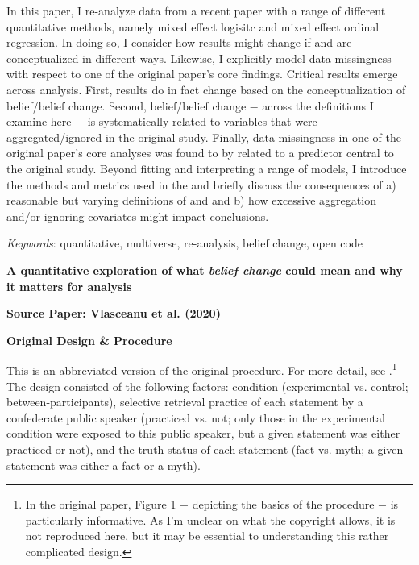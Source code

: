 \documentclass[12pt]{article}  %
\begin{document}
\noindent In this paper, I re-analyze data from a recent paper \parencite{vlasceanu_synchronization_2020} with a range of different quantitative methods, namely mixed effect logisitc and mixed effect ordinal regression. In doing so, I consider how results might change if  and  are conceptualized in different ways. Likewise, I explicitly model data missingness with respect to one of the original paper's core findings. Critical results emerge across analysis. First, results do in fact change based on the conceptualization of belief/belief change. Second, belief/belief change $-$ across the definitions I examine here $-$ is systematically related to variables that were aggregated/ignored in the original study. Finally, data missingness in one of the original paper's core analyses was found to by related to a predictor central to the original study. Beyond fitting and interpreting a range of models, I introduce the methods and metrics used in the \textcite{vlasceanu_synchronization_2020} and briefly discuss the consequences of a) reasonable but varying definitions of  and  and b) how excessive aggregation and/or ignoring covariates might impact conclusions.

\textit{Keywords}: quantitative, multiverse, re-analysis, belief change, open code


\newpage

\begin{center}
    \textbf{A quantitative exploration of what \textit{belief change} could mean and why it matters for analysis}
\end{center}


\noindent\textbf{Source Paper: Vlasceanu et al. (2020)}

\noindent\textbf{Original Design \& Procedure}

This is an abbreviated version of the original procedure. For more detail, see \textcite{vlasceanu_synchronization_2020}.\footnote{In the original paper, Figure 1 $-$ depicting the basics of the procedure $-$ is particularly informative. As I'm unclear on what the copyright allows, it is not reproduced here, but it may be essential to understanding this rather complicated design.} The design consisted of the following factors: condition (experimental vs. control; between-participants), selective retrieval practice of each statement by a confederate public speaker (practiced vs. not; only those in the experimental condition were exposed to this public speaker, but a given statement was either practiced or not), and the truth status of each statement (fact vs. myth; a given statement was either a fact or a myth).
\end{document}
